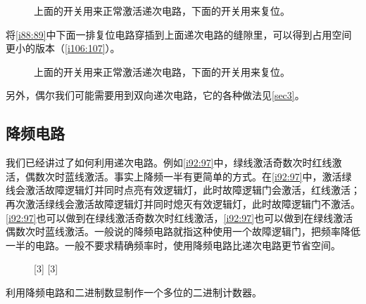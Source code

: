 \begin{figure}[!ht]
\centering
{}%
%
\caption{上面的开关用来正常激活递次电路，下面的开关用来复位。}
\label{i88:89}
\end{figure}

将\autoref{i88:89}中下面一排复位电路穿插到上面递次电路的缝隙里，可以得到占用空间更小的版本（\autoref{i106:107}）。

\begin{figure}[!ht]
\centering
{}%
%
\caption{上面的开关用来正常激活递次电路，下面的开关用来复位。}
\label{i106:107}
\end{figure}

另外，偶尔我们可能需要用到双向递次电路，它的各种做法见\autoref{sec3}。

\subsection{降频电路}\label{sec2:1}

我们已经讲过了如何利用递次电路。例如\autoref{i92:97}中，绿线激活奇数次时红线激活，偶数次时蓝线激活。事实上降频一半有更简单的方式。在\autoref{i92:97}中，激活绿线会激活故障逻辑灯并同时点亮有效逻辑灯，此时故障逻辑门会激活，红线激活；再次激活绿线会激活故障逻辑灯并同时熄灭有效逻辑灯，此时故障逻辑门不激活。\autoref{i92:97}也可以做到在绿线激活奇数次时红线激活，\autoref{i92:97}也可以做到在绿线激活偶数次时蓝线激活。一般说的降频电路就指这种使用一个故障逻辑门，把频率降低一半的电路。一般不要求精确频率时，使用降频电路比递次电路更节省空间。

\begin{figure}[!ht]
\centering
{}%
[3]%
%
[3]%
\caption{}
\label{i92:97}
\end{figure}

\begin{problem}{}{}
利用降频电路和二进制数显制作一个多位的二进制计数器。
\end{problem}

\subsection{}

